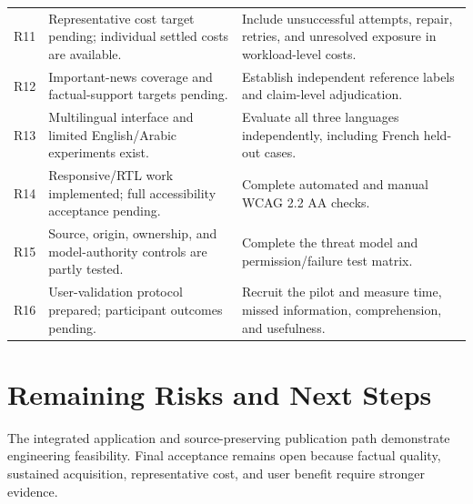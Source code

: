 \begin{longtable}{L{0.9cm}L{6cm}L{\dimexpr\linewidth-6.9cm-6\tabcolsep\relax}}
R11 & Representative cost target pending; individual settled costs are available.
& Include unsuccessful attempts, repair, retries, and unresolved exposure in workload-level costs. \\
R12 & Important-news coverage and factual-support targets pending.
& Establish independent reference labels and claim-level adjudication. \\
R13 & Multilingual interface and limited English/Arabic experiments exist.
& Evaluate all three languages independently, including French held-out cases. \\
R14 & Responsive/RTL work implemented; full accessibility acceptance pending.
& Complete automated and manual WCAG 2.2 AA checks. \\
R15 & Source, origin, ownership, and model-authority controls are partly tested.
& Complete the threat model and permission/failure test matrix. \\
R16 & User-validation protocol prepared; participant outcomes pending.
& Recruit the pilot and measure time, missed information, comprehension, and usefulness. \\
\end{longtable}
\endgroup

\section{Remaining Risks and Next Steps}

The integrated application and source-preserving publication path demonstrate engineering feasibility. Final acceptance remains open because factual quality, sustained acquisition, representative cost, and user benefit require stronger evidence.

